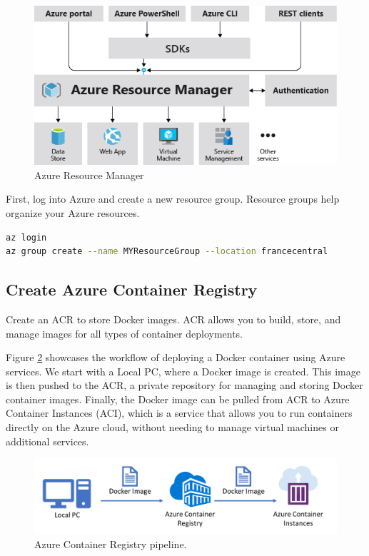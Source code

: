 \documentclass{article}
\begin{document}
\begin{figure}[H]
\begin{center}
\includegraphics[scale = .45]{figures/arg.png}
\caption{Azure Resource Manager \cite{arm}}
\label{fig:arm}
\end{center}
\end{figure}

First, log into Azure and create a new resource group. Resource groups help organize your Azure resources.

\begin{lstlisting}[language=bash]
az login
az group create --name MYResourceGroup --location francecentral
\end{lstlisting}

\subsection{Create Azure Container Registry}  

Create an ACR \cite{acrm} to store Docker images. ACR allows you to build, store, and manage images for all types of container deployments.


Figure \ref{fig:acr} showcases the workflow of deploying a Docker container using Azure services. We start with a Local PC, where a Docker image is created. This image is then pushed to the ACR, a private repository for managing and storing Docker container images. Finally, the Docker image can be pulled from ACR to Azure Container Instances (ACI), which is a service that allows you to run containers directly on the Azure cloud, without needing to manage virtual machines or additional services. 

\begin{figure}[H] 
\begin{center}
\includegraphics[scale = .4]{figures/acr.png}
\caption{Azure Container Registry pipeline.}
\label{fig:acr}
\end{center}
\end{figure}
\end{document}
